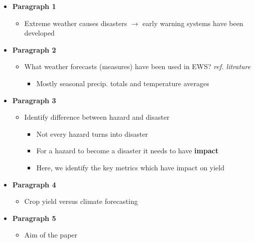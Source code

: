 \documentclass[12pt]{iopart}
\begin{document}
\begin{itemize}
\color{blue}
\item[] \textbf{Paragraph 1}

\begin{itemize}

\item Extreme weather causes disasters $\rightarrow$	 early warning systems have been developed
\end{itemize}
\item[] \textbf{Paragraph 2}
\begin{itemize}
\item What weather forecasts (measures) have been used in EWS? \textit{ref. litrature}
\begin{itemize}
\item Mostly seasonal precip. totals and temperature averages
\end{itemize}
\end{itemize}

\item[] \textbf{Paragraph 3} 
\begin{itemize}

\item Identify difference between hazard and disaster

\begin{itemize}
\item Not every hazard turns into disaster
\item For a hazard to become a disaster it needs to have \textbf{impact}
\item Here, we identify the key metrics which have impact on yield
\end{itemize}

\end{itemize}

\item[] \textbf{Paragraph 4}
\begin{itemize}
\item Crop yield versus climate forecasting
\end{itemize}


\item[] \textbf{Paragraph 5}
	\begin{itemize}
		\item Aim of the paper
		\end{itemize}
	 
	\end{itemize}
\end{document}
